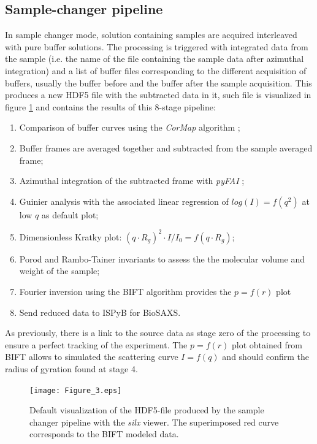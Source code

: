 \documentclass[preprint]{iucr}              %
\begin{document}
\subsection{Sample-changer pipeline}
\label{sc-pipeline}
In sample changer mode, solution containing samples are acquired interleaved with pure buffer solutions.
The processing is triggered with integrated data from the sample (i.e. the name of the file containing the sample data after azimuthal integration) and a list of 
buffer files corresponding to the different acquisition of buffers, usually the buffer before and the buffer after the sample acquisition. 
This produces a new HDF5 file with the subtracted data in it, such file is visualized in figure \ref{subtracted}
and contains the results of this 8-stage pipeline: 
\begin{enumerate}
    \item Comparison of buffer curves using the \textit{CorMap} algorithm \cite{CorMap};
    \item Buffer frames are averaged together and subtracted from the sample averaged frame;
    \item Azimuthal integration of the subtracted frame with \textit{pyFAI} \cite{pyfai_2020};
    \item Guinier analysis with the associated linear regression of $log(I) = f(q^2)$ at low $q$ as default plot;
    \item Dimensionless Kratky plot: $(q\cdot R_g)^2\cdot I/I_0 = f(q\cdot R_g)$;
    \item Porod \cite{glatter+kratky} and Rambo-Tainer invariants \cite{RamboTainerNature2013} to assess the the molecular volume and weight of the sample;
    \item Fourier inversion using the BIFT algorithm \cite{bift} provides the $p=f(r)$ plot
    \item Send reduced data to ISPyB for BioSAXS.
\end{enumerate}
As previously, there is a link to the source data as stage zero of the processing to ensure a perfect tracking of the experiment.
The $p=f(r)$ plot obtained from BIFT allows to simulated the scattering curve $I=f(q)$ and should confirm the radius of gyration found at stage 4.

\begin{figure}
\label{subtracted}
\begin{center}
\texttt{[image: Figure\_3.eps]}
\caption{Default visualization of the HDF5-file produced by the sample changer pipeline with the \textit{silx} viewer. 
The superimposed red curve corresponds to the BIFT modeled data.}
\end{center}
\end{figure}
\end{document}
